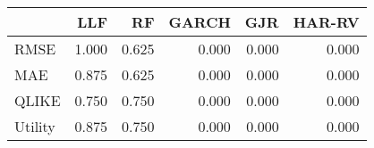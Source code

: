 \begin{tabular}{lrrrrr}
\toprule
 & LLF & RF & GARCH & GJR & HAR-RV \\
\midrule
RMSE & 1.000 & 0.625 & 0.000 & 0.000 & 0.000 \\
MAE & 0.875 & 0.625 & 0.000 & 0.000 & 0.000 \\
QLIKE & 0.750 & 0.750 & 0.000 & 0.000 & 0.000 \\
Utility & 0.875 & 0.750 & 0.000 & 0.000 & 0.000 \\
\bottomrule
\end{tabular}
